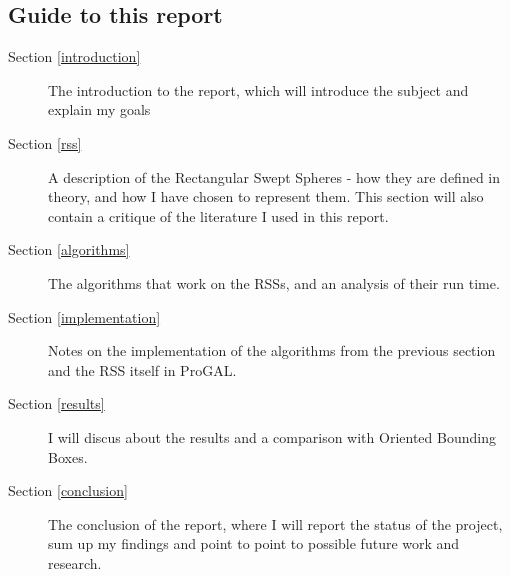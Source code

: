 \subsection{Guide to this report}
\begin{description}
\item[Section \ref{introduction}] The introduction to the report, which will introduce the subject and explain my goals
\item[Section \ref{rss}] A description of the Rectangular Swept Spheres - how they are defined in theory, and how I have chosen to represent them. This section will also contain a critique of the literature I used in this report.
\item[Section \ref{algorithms}] The algorithms that work on the RSSs, and an analysis of their run time.
\item[Section \ref{implementation}] Notes on the implementation of the algorithms from the previous section and the RSS itself in ProGAL.
\item[Section \ref{results}] I will discus about the results and a comparison with Oriented Bounding Boxes. 
\item[Section \ref{conclusion}] The conclusion of the report, where I will report the status of the project, sum up my findings and point to point to possible future work and research. 
\end{description}
